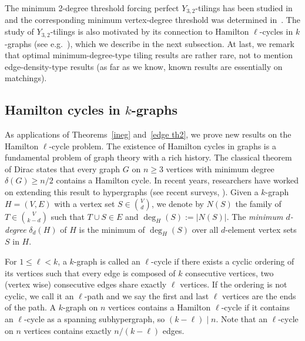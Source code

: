 \documentclass[11pt, reqno]{amsart}    	%
\theoremstyle{definition}
\numberwithin{equation}{section}
\begin{document}
The minimum 2-degree threshold forcing perfect $Y_{3,2}$-tilings has been studied in~\cite{Daniela2006Loose,2013Tiling} and the corresponding minimum vertex-degree threshold was determined in~\cite{2015Minimum}.
The study of $Y_{3,2}$-tilings is also motivated by its connection to Hamilton $\ell$-cycles in $k$-graphs (see e.g.~\cite{Han2015Minimum}), which we describe in the next subsection.
At last, we remark that optimal minimum-degree-type tiling results are rather rare, not to mention edge-density-type results (as far as we know, known results are essentially on matchings).

	
	\subsection{Hamilton cycles in $k$-graphs}
	As applications of Theorems~\ref{ineg} and~\ref{edge th2}, we prove new results on the Hamilton $\ell$-cycle problem. 
	The existence of Hamilton cycles in graphs is a fundamental problem of graph theory with a rich history. 
	The classical theorem of Dirac \cite{1952Some} states that every graph $G$ on $n\ge3$ vertices with minimum degree $\delta(G)\ge n/2$ contains a Hamilton cycle. In recent years, researchers have worked on extending this result to hypergraphs (see recent surveys, \cite{MR3727617,Vojtech2010Dirac}).  
	Given a $ k $-graph $H=(V,E)$ with a vertex set $S\in \binom{V}{d} $, 
	we denote by $ N(S) $ the family of $T\in\binom{V}{k-d} $ such that $ T\cup S\in E $ and $ \deg_H(S):=|N(S)| $. 
	The \emph{minimum $ d $-degree} $ \delta_{d}(H) $ of $H$ is the minimum of $ \deg_{H}(S) $ over all $ d $-element vertex sets $S$ in $H$.
	
	For $ 1\le \ell <k $, a $ k $-graph is called an $ \ell $-cycle if there exists a cyclic ordering of its vertices such that every edge is composed of $ k $ consecutive vertices, two (vertex wise) consecutive edges share exactly $ \ell $ vertices. If the ordering is not cyclic, we call it an $ \ell $-path and we say the first and last $ \ell $ vertices are the ends of the path. A $ k $-graph on $ n $ vertices contains a Hamilton $\ell$-cycle  if it contains an $ \ell $-cycle as a spanning subhypergraph, so $(k-\ell)\mid n$. Note that an $ \ell $-cycle on $ n $ vertices contains exactly $ n/(k-\ell) $ edges.
	
\end{document}
